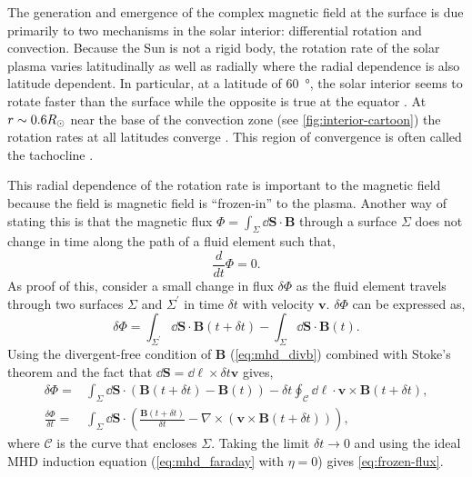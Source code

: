 The generation and emergence of the complex magnetic field at the surface is due primarily to two mechanisms in the solar interior: differential rotation and convection. Because the Sun is not a rigid body, the rotation rate of the solar plasma varies latitudinally as well as radially where the radial dependence is also latitude dependent. In particular, at a latitude of \SI{60}{\degree}, the solar interior seems to rotate faster than the surface while the opposite is true at the equator \citep{thompson_differential_1996}. At $r\sim0.6R_\odot$ near the base of the convection zone (see \autoref{fig:interior-cartoon}) the rotation rates at all latitudes converge \citep{golub_solar_2010}. This region of convergence is often called the tachocline \citep{aschwanden_physics_2006}.

This radial dependence of the rotation rate is important to the magnetic field because the field is magnetic field is ``frozen-in'' to the plasma. Another way of stating this is that the magnetic flux $\Phi=\int_\Sigma\dd{\mathbf{S}}\cdot\mathbf{B}$ through a surface $\Sigma$ does not change in time along the path of a fluid element such that,
\begin{equation}\label{eq:frozen-flux}
    \frac{d}{dt}\Phi = 0.
\end{equation}
As proof of this, consider a small change in flux $\delta\Phi$ as the fluid element travels through two surfaces $\Sigma$ and $\Sigma^\prime$ in time $\delta t$ with velocity $\mathbf{v}$. $\delta\Phi$ can be expressed as,
\begin{equation*}
    \delta\Phi = \int_{\Sigma^\prime}\dd{\mathbf{S}}\cdot\mathbf{B}(t+\delta t) - \int_\Sigma\dd{\mathbf{S}}\cdot\mathbf{B}(t).
\end{equation*}
Using the divergent-free condition of $\mathbf{B}$ (\autoref{eq:mhd_divb}) combined with Stoke's theorem and the fact that $\dd{\mathbf{S}}=\dd{\ell}\times\delta t\mathbf{v}$ gives,
\begin{align}
    \delta\Phi =& \int_\Sigma\dd{\mathbf{S}}\cdot(\mathbf{B}(t+\delta t) - \mathbf{B}(t)) - \delta t\oint_\mathcal{C}\dd{\ell}\cdot\mathbf{v}\times\mathbf{B}(t + \delta t), \nonumber\\
    \frac{\delta\Phi}{\delta t} =& \int_\Sigma\dd{\mathbf{S}}\cdot\left( \frac{\mathbf{B}(t+\delta t)}{\delta t} - \nabla\times(\mathbf{v}\times\mathbf{B}(t + \delta t)) \right),\nonumber
\end{align}
where $\mathcal{C}$ is the curve that encloses $\Sigma$. Taking the limit $\delta t\to0$ and using the ideal MHD induction equation (\autoref{eq:mhd_faraday} with $\eta=0$) gives \autoref{eq:frozen-flux}.

